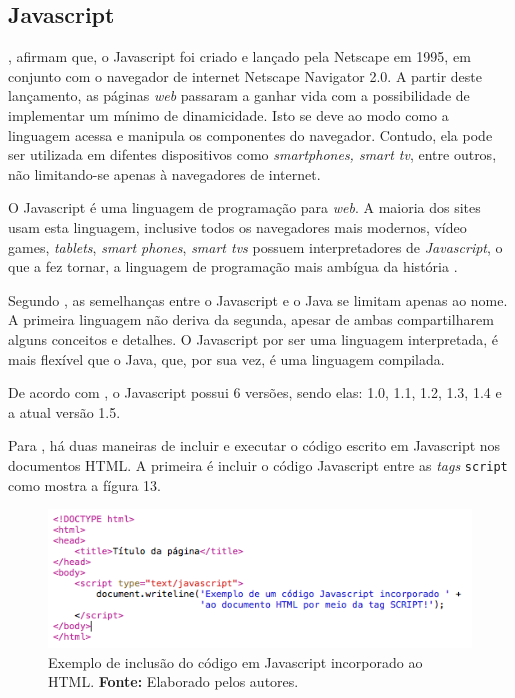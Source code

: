 \subsection{Javascript}

, afirmam que, o Javascript foi criado e lançado pela Netscape em 1995, em conjunto com o navegador de internet Netscape Navigator 2.0. A partir deste lançamento, as páginas \textit{web} passaram a ganhar vida com a possibilidade de implementar um mínimo de dinamicidade. Isto se deve ao modo como a linguagem acessa e manipula os componentes do navegador. Contudo, ela pode ser utilizada em difentes dispositivos como \textit{smartphones, smart tv}, entre outros, não limitando-se apenas à navegadores de internet.

O Javascript é uma linguagem de programação para \textit{web}. A maioria dos sites usam esta linguagem, inclusive todos os navegadores mais modernos, vídeo games, \textit{tablets}, \textit{smart phones}, \textit{smart tvs} possuem interpretadores de \textit{Javascript}, o que a fez tornar, a linguagem de programação mais ambígua da história \cite{flanagan_javascript_definitive_guide}.

Segundo , as semelhanças entre o Javascript e o Java se limitam apenas ao nome. A primeira linguagem não deriva da segunda, apesar de ambas compartilharem alguns conceitos e detalhes. O Javascript por ser uma linguagem interpretada, é mais flexível que o Java, que, por sua vez, é uma linguagem compilada.

De acordo com , o Javascript possui 6 versões, sendo elas: 1.0, 1.1, 1.2, 1.3, 1.4 e a atual versão 1.5.

Para , há duas maneiras de incluir e executar o código escrito em Javascript nos documentos HTML. A primeira é incluir o código Javascript entre as \textit{tags} \texttt{script} como mostra a fígura 13. 

\begin{figure}[h!]
	\centerline{\includegraphics[scale=0.8]{./imagens/javascript_code.png}}
	\caption[Exemplo de inclusão do código em Javascript incorporado ao HTML]
	{Exemplo de inclusão do código em Javascript incorporado ao HTML. \textbf{Fonte:} Elaborado pelos autores.}
	\label{fig:exemplo1}
\end{figure}

